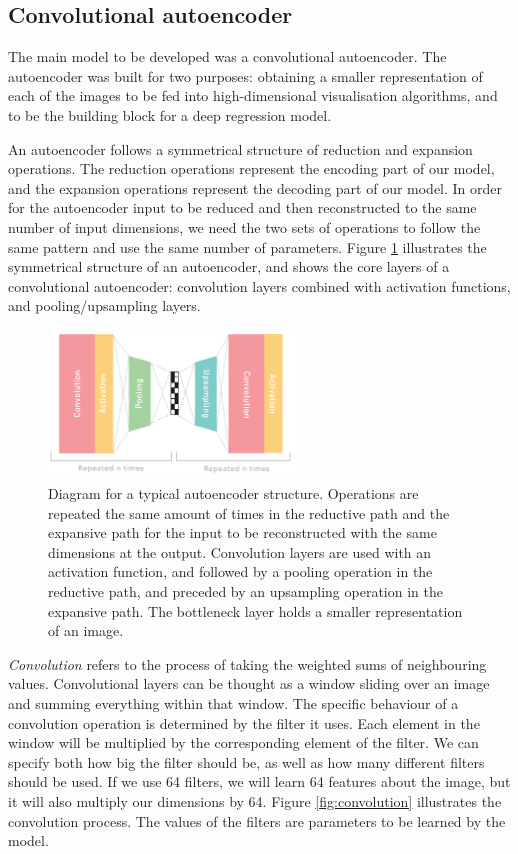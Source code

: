 \subsection{Convolutional autoencoder}

The main model to be developed was a convolutional autoencoder. The autoencoder was built for two purposes: obtaining a smaller representation of each of the images to be fed into high-dimensional visualisation algorithms, and to be the building block for a deep regression model.

An autoencoder follows a symmetrical structure of reduction and expansion operations. The reduction operations represent the encoding part of our model, and the expansion operations represent the decoding part of our model. In order for the autoencoder input to be reduced and then reconstructed to the same number of input dimensions, we need the two sets of operations to follow the same pattern and use the same number of parameters. Figure \ref{fig:symmstruc} illustrates the symmetrical structure of an autoencoder, and shows the core layers of a convolutional autoencoder: convolution layers combined with activation functions, and pooling/upsampling layers.

\begin{figure}[h!]
    \centering
    \includegraphics[width=0.6\textwidth]{dissertation/figures/autoencoder_repeat_structure.png}
    \caption{Diagram for a typical autoencoder structure. Operations are repeated the same amount of times in the reductive path and the expansive path for the input to be reconstructed with the same dimensions at the output. Convolution layers are used with an activation function, and followed by a pooling operation in the reductive path, and preceded by an upsampling operation in the expansive path. The bottleneck layer holds a smaller representation of an image.}
    \label{fig:symmstruc}
\end{figure}

\textit{Convolution} refers to the process of taking the weighted sums of neighbouring values. Convolutional layers can be thought as a window sliding over an image and summing everything within that window. The specific behaviour of a convolution operation is determined by the filter it uses. Each element in the window will be multiplied by the corresponding element of the filter. We can specify both how big the filter should be, as well as how many different filters should be used. If we use 64 filters, we will learn 64 features about the image, but it will also multiply our dimensions by 64. Figure \ref{fig:convolution} illustrates the convolution process. The values of the filters are parameters to be learned by the model. 

